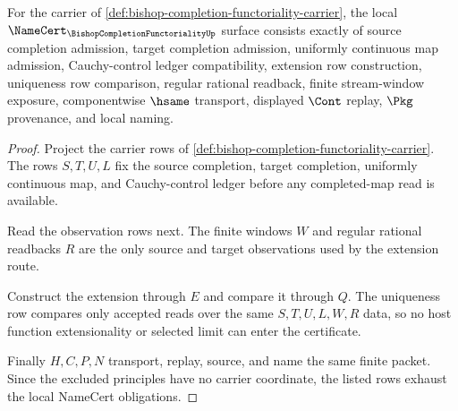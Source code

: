 \begin{theorem}
\label{thm:bishop-completion-functoriality-namecert-obligations}
For the carrier of \autoref{def:bishop-completion-functoriality-carrier}, the local $\NameCert_{\BishopCompletionFunctorialityUp}$ surface consists exactly of source completion admission, target completion admission, uniformly continuous map admission, Cauchy-control ledger compatibility, extension row construction, uniqueness row comparison, regular rational readback, finite stream-window exposure, componentwise $\hsame$ transport, displayed $\Cont$ replay, $\Pkg$ provenance, and local naming.
\end{theorem}
\begin{proof}
Project the carrier rows of \autoref{def:bishop-completion-functoriality-carrier}. The rows $S,T,U,L$ fix the source completion, target completion, uniformly continuous map, and Cauchy-control ledger before any completed-map read is available.

Read the observation rows next. The finite windows $W$ and regular rational readbacks $R$ are the only source and target observations used by the extension route.

Construct the extension through $E$ and compare it through $Q$. The uniqueness row compares only accepted reads over the same $S,T,U,L,W,R$ data, so no host function extensionality or selected limit can enter the certificate.

Finally $H,C,P,N$ transport, replay, source, and name the same finite packet. Since the excluded principles have no carrier coordinate, the listed rows exhaust the local NameCert obligations.
\end{proof}

